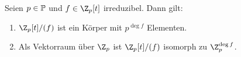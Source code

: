 \begin{corollary}
 Seien $p \in \mathbb P$ und $f \in \Z_p[t]$ irreduzibel. Dann gilt:
 \begin{enumerate}
  \item $\Z_p[t]/(f)$ ist ein Körper mit $p^{\deg f}$ Elementen. 
  \item Als Vektorraum über $\Z_p$ ist $\Z_p[t]/(f)$ isomorph zu $\Z_p^{\deg f}$.
 \end{enumerate}
\end{corollary}




